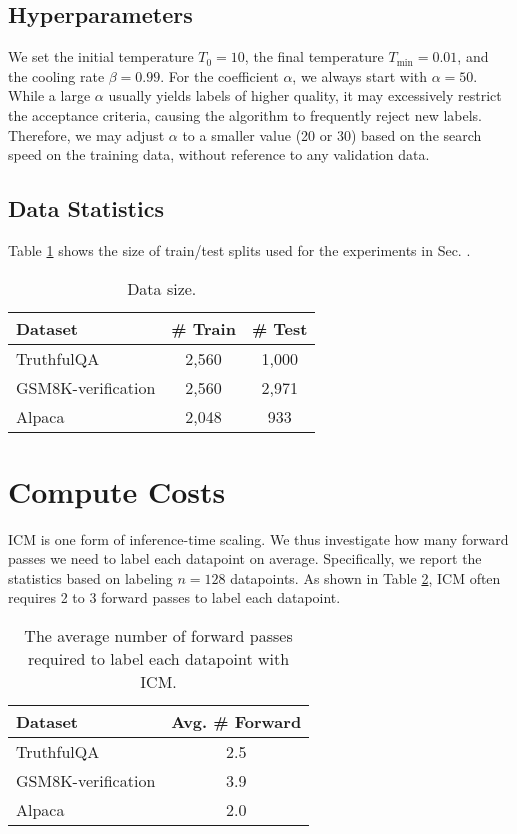 \documentclass{article}
\newcommand{\ourmethod}[0]{\textsc{ICM}\xspace}
\begin{document}
\subsection{Hyperparameters}

We set the initial temperature $T_0=10$, the final temperature $T_\text{min}=0.01$, and the cooling rate $\beta=0.99$. For the coefficient $\alpha$, we always start with $\alpha=50$. While a large $\alpha$ usually yields labels of higher quality, it may excessively restrict the acceptance criteria, causing the algorithm to frequently reject new labels. Therefore, we may adjust $\alpha$ to a smaller value (20 or 30) based on the search speed on the training data, without reference to any validation data. 

\subsection{Data Statistics}

Table \ref{tab:datasize} shows the size of train/test splits used for the experiments in Sec. \label{sec:nlp_results}.

\begin{table}[H]
    \centering
    \caption{Data size.}
    \begin{tabular}{lcc}
    \toprule
    \textbf{Dataset} & \textbf{\# Train} & \textbf{\# Test} \\
    \midrule
    TruthfulQA & 2,560 & 1,000 \\
    GSM8K-verification & 2,560 & 2,971\\
    Alpaca & 2,048 & 933\\
    \bottomrule
    \end{tabular}
    \label{tab:datasize}
\end{table}

\section{Compute Costs}

\ourmethod is one form of inference-time scaling. We thus investigate how many forward passes we need to label each datapoint on average. Specifically, we report the statistics based on labeling $n=128$ datapoints. As shown in Table \ref{tab:cost}, \ourmethod often requires 2 to 3 forward passes to label each datapoint.


\begin{table}[H]
    \centering
    \caption{The average number of forward passes required to label each datapoint with ICM.}
    \label{tab:cost}
    \begin{tabular}{lc}
    \toprule
    \textbf{Dataset} & \textbf{Avg. \# Forward} \\
    \midrule
    TruthfulQA & 2.5 \\
    GSM8K-verification & 3.9 \\
    Alpaca & 2.0\\
    \bottomrule
    \end{tabular}
\end{table}
\end{document}
